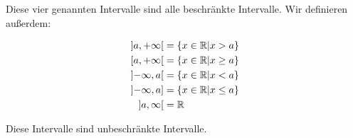 \documentclass{article}
\begin{document}
Diese vier genannten Intervalle sind alle beschränkte Intervalle. Wir definieren außerdem:

\begin{align*}
\interval[open]{a}{+\infty}       &= \{ x \in \mathbb{R} | x > a \} \\
\interval[open right]{a}{+\infty} &= \{ x \in \mathbb{R} | x  \geq a \} \\
\interval[open]{-\infty}{a}       &= \{ x \in \mathbb{R} | x < a \} \\
\interval[open left]{-\infty}{a}  &= \{ x \in \mathbb{R} | x \leq a \} \\
\interval[open]{a}{\infty}        &= \mathbb{R} \\
\end{align*}

Diese Intervalle sind unbeschränkte Intervalle.
\end{document}
